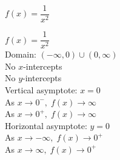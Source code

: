 {$f(x) = \dfrac{1}{x^{2}}$}
{$f(x) = \dfrac{1}{x^{2}}$\\
Domain: $(-\infty, 0) \cup (0, \infty)$\\
No $x$-intercepts\\
No $y$-intercepts\\
Vertical asymptote: $x = 0$\\
As $x \rightarrow 0^{-}, \; f(x) \rightarrow \infty$\\
As $x \rightarrow 0^{+}, \; f(x) \rightarrow \infty$\\
Horizontal asymptote: $y = 0$\\
As $x \rightarrow -\infty, \; f(x) \rightarrow 0^{+}$\\
As $x \rightarrow \infty, \; f(x) \rightarrow 0^{+}$

\begin{center}
\end{center}}

